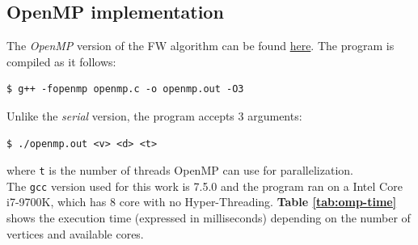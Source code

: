\subsection{OpenMP implementation}
The \emph{OpenMP} version of the FW algorithm can be found \href{https://github.com/firaja/Parallel-FloydWarshall/blob/master/openmp.c}{here}. 
The program is compiled as it follows:
\begin{lstlisting}[basicstyle=\footnotesize\ttfamily]
$ g++ -fopenmp openmp.c -o openmp.out -O3
\end{lstlisting}
Unlike the \emph{serial} version, the program accepts 3 arguments:
\begin{lstlisting}[basicstyle=\footnotesize\ttfamily]
$ ./openmp.out <v> <d> <t>
\end{lstlisting}
where \texttt{t} is the number of threads OpenMP can use for parallelization. \\
The \texttt{gcc} version used for this work is 7.5.0 and the program ran on a Intel Core i7-9700K, which has 8 core with no Hyper-Threading.
\textbf{Table \ref*{tab:omp-time}} shows the execution time (expressed in milliseconds) depending on the number of vertices and available cores.

